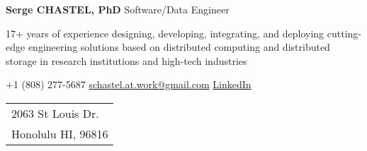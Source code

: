 \documentclass[10pt]{article}
\newcommand{\mynewsection}[2]{%
  \medskip

  \textbf{\color{colorsection}\LARGE {#2}\hspace{0.25in}{#1}}
}
\begin{document}
{ \Large \textbf{Serge CHASTEL, PhD} Software/Data Engineer }

\medskip
        
17+ years of experience designing, developing, integrating, and
deploying cutting-edge engineering solutions based on distributed
computing and distributed storage in research institutions and
high-tech industries

\Mobilefone{}
+1 (808) 277-5687
\hfill
\Email{}
\href{mailto:schastel.at.work@gmail.com}{schastel.at.work@gmail.com}
\hfill
{}
\href{https://www.linkedin.com/in/serge-chastel-76aa46218/}{LinkedIn}
\hfill
\Letter{}
\begin{tabular}[t]{l}
  2063 St Louis Dr. \\
  Honolulu HI, 96816
\end{tabular}

\mynewsection{Skills}{\faTasks}


\mynewsection{Experience}{\faBriefcase}

\newlength{\expitem}
\setlength{\expitem}{0.60\linewidth}

\newlength{\expskill}
\setlength{\expskill}{0.39\linewidth}

\newlength{\itemskilljump}
\setlength{\itemskilljump}{0mm}

\newcommand{\experience}[5]{%
  \node (origin) [rectangle, minimum width=1.0\linewidth,
  anchor=south west,
  inner ysep = 2pt,
  shading = axis, shading angle=0,
  left color=colorsection!30!white,
  right color = colorsection!10!white] {%
    \hspace*{-7mm}
    \begin{minipage}{0.95\linewidth}
      \medskip
        
      \textbf{\large #1}
      \hfill
      \textit{\small #2}

      {\small #4}
      \hfill    
      \textit{\small #3}

      \textbf{#5}
    \end{minipage}
  };
}
\end{document}
